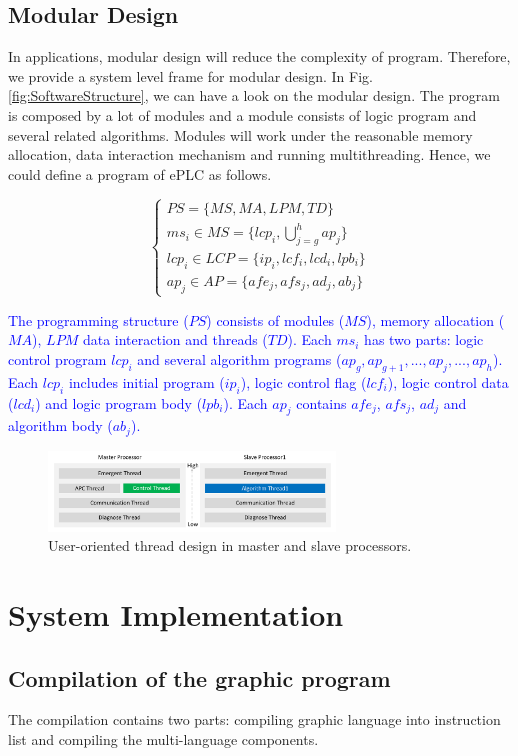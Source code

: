 \documentclass[journal,UTF8]{IEEEtran}
\begin{document}
\subsection{Modular Design}  
In applications, modular design will reduce the complexity of program. Therefore, we provide a system level frame for modular design. In Fig. \ref{fig:SoftwareStructure}, we can have a look on the modular design. The program is composed by a lot of modules and a module consists of logic program and several related algorithms. Modules will work under the reasonable memory allocation, data interaction mechanism and  running multithreading. Hence, we could define a program of ePLC as follows.

\begin{equation}
	\left\{
	\begin{array}{l}
	PS = \{MS, MA , LPM, TD\}\\
	ms_i \in MS = \{lcp_i, \bigcup_{j=g}^h ap_j\}\\
	lcp_i \in LCP = \{ip_i, lcf_i, lcd_i, lpb_i\}\\
	ap_j \in AP = \{afe_j, afs_j, ad_j, ab_j\}
	\end{array}
	\right.
	\end{equation}

\textcolor{blue}{The programming structure ($PS$) consists of modules ($MS$), memory allocation ($MA$), $LPM$ data interaction and threads ($TD$). Each $ms_i$ has two parts: logic control program $lcp_i$ and several algorithm programs ($ap_g, ap_{g+1},..., ap_{j},..., ap_{h}$). Each $lcp_i$ includes initial program ($ip_i$), logic control flag ($lcf_i$), logic control data ($lcd_i$) and logic program body ($lpb_i$). Each $ap_{j}$ contains $afe_{j}$, $afs_{j}$, $ad_{j}$ and algorithm body ($ab_{j}$).}

\begin{figure}
	\centering
	\includegraphics[width=3in]{fig/FIG5.pdf}
	\caption{ User-oriented thread design in master and slave processors.}
	\label{fig:Threads}
\end{figure}
 \section{System Implementation}
 \label{Process}
 \subsection{Compilation of the graphic program}
The compilation contains two parts: compiling graphic language into instruction list and compiling the multi-language components.
 	
\end{document}
